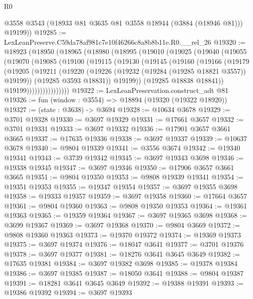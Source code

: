 \begin{lexlean}{R0}
\begin{coremodule}
        @3558
        @3543
        (@18933 @81 @3635 @81 @3558 @18944 (@3884 (@18946 @81)))
        @19199))
@19285 := LexLeanPreserve.C59da78af981c7e10f46266c8a8b8b11e.R0.__rel_26
@19320 := @18923
    (@18950
      (@18965
        (@18980
          (@18995
            (@19010
              (@19025
                (@19040
                  (@19055
                    (@19070
                      (@19085
                        (@19100
                          (@19115
                            (@19130
                              (@19145
                                (@19160
                                  (@19166
                                    (@19179
                                      (@19205
                                        (@19211
                                          (@19220
                                            (@19226 (@19232 (@19284 (@19285 @18821 @3557)) @19199))
                                            (@19285 @3593 @18831))
                                          @19199))
                                      (@19285 @18838 @18841))
                                    @19199))))))))))))))))
@19322 := LexLeanPreservation.construct_adt @81
@19326 := fun (window : @3554) => @18894 (@19320 (@19322 @18920))
@19327 := (state : @3638) -> @3694
@19328 := @10634 @3678
@19329 := @3701 @19328
@19330 := @3697 @19329
@19331 := @17661 @3657
@19332 := @3701 @19331
@19333 := @3697 @19332
@19336 := @17901 @3657 @3661 @3665
@19337 := @17635 @19336
@19338 := @3697 @19337
@19339 := @10637 @3678
@19340 := @9804 @19339
@19341 := @3556 @3674
@19342 := @19340 @19341
@19343 := @3739 @19342
@19345 := @3697 @19343 @3698
@19346 := @19338 @19345
@19347 := @3697 @19346
@19350 := @17906 @3657 @3661 @3665
@19351 := @9804 @19350
@19353 := @9808 @19339 @19341
@19354 := @19351 @19353
@19355 := @19347 @19354
@19357 := @3697 @19355 @3698
@19358 := @19333 @19357
@19359 := @3697 @19358
@19360 := @17664 @3657
@19361 := @9804 @19360
@19363 := @9808 @19350 @19353
@19364 := @19361 @19363
@19365 := @19359 @19364
@19367 := @3697 @19365 @3698
@19368 := @3699 @19367
@19369 := @3697 @19368
@19370 := @9804 @3669
@19372 := @9808 @19360 @19363
@19373 := @19370 @19372
@19374 := @19369 @19373
@19375 := @3697 @19374
@19376 := @18047 @3641
@19377 := @3701 @19376
@19378 := @3697 @19377
@19381 := @18276 @3641 @3645 @3649
@19382 := @17635 @19381
@19384 := @3697 @19382 @3698
@19385 := @19378 @19384
@19386 := @3697 @19385
@19387 := @18050 @3641
@19388 := @9804 @19387
@19391 := @18281 @3641 @3645 @3649
@19392 := @19388 @19391
@19393 := @19386 @19392
@19394 := @3697 @19393

\end{coremodule}
\end{lexlean}

